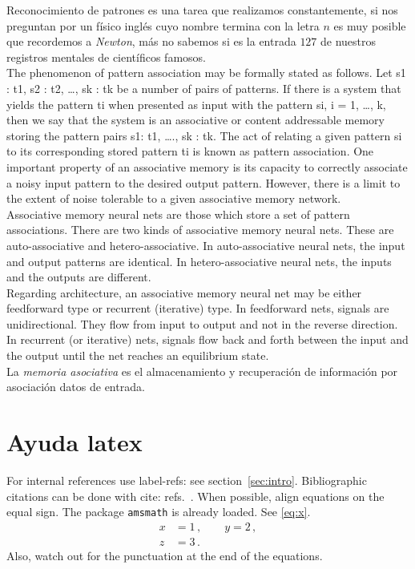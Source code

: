 \documentclass[letterpaper,12pt]{article}
\begin{document}
Reconocimiento de patrones es una tarea que realizamos constantemente, si nos preguntan por un físico inglés cuyo nombre termina con la letra $n$ es muy posible que recordemos a \emph{Newton}, más no sabemos si es la entrada $127$ de nuestros registros mentales de científicos famosos. \\

The phenomenon of pattern association may be formally stated as follows. Let s1 : t1, s2 : t2, …, sk : tk be a number of pairs of patterns. If there is a system that yields the pattern ti when presented as input with the pattern si, i = 1, …, k, then we say that the system is an associative or content addressable memory storing the pattern pairs s1: t1, …., sk : tk. The act of relating a given pattern si to its corresponding stored pattern ti is known as pattern association. One important property of an associative memory is its capacity to correctly associate a noisy input pattern to the desired output pattern. However, there is a limit to the extent of noise tolerable to a given associative memory network. \\

Associative memory neural nets are those which store a set of pattern associations. There are two kinds of associative memory neural nets. These are auto-associative and hetero-associative. In auto-associative neural nets, the input and output patterns are identical. In hetero-associative neural nets, the inputs and the outputs are different. \\

Regarding architecture, an associative memory neural net may be either feedforward type or recurrent (iterative) type. In feedforward nets, signals are unidirectional. They flow from input to output and not in the reverse direction. In recurrent (or iterative) nets, signals flow back and forth between the input and the output until the net reaches an equilibrium state. \\

La \emph{memoria asociativa} es el almacenamiento y recuperación de información por asociación datos de entrada. \\




\appendix
\section{Ayuda latex}

For internal references use label-refs: see section~\ref{sec:intro}.
Bibliographic citations can be done with cite: refs.~\cite{a,b0,c}.
When possible, align equations on the equal sign. The package
\texttt{amsmath} is already loaded. See \eqref{eq:x}.
\begin{equation}
\label{eq:x}
\begin{split}
x &= 1 \,,
\qquad
y = 2 \,,
\\
z &= 3 \,.
\end{split}
\end{equation}
Also, watch out for the punctuation at the end of the equations.
\end{document}
